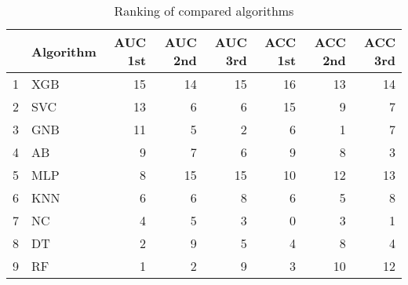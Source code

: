 \begin{table}
\footnotesize
\caption{Ranking of compared algorithms}
\label{tab:places}
\begin{tabular}{llrrrrrr}
\hline
 & Algorithm & AUC 1st & AUC 2nd & AUC 3rd & ACC 1st & ACC 2nd & ACC 3rd \\
\hline
1 & XGB & 15 & 14 & 15 & 16 & 13 & 14 \\
2 & SVC & 13 & 6 & 6 & 15 & 9 & 7 \\
3 & GNB & 11 & 5 & 2 & 6 & 1 & 7 \\
4 & AB & 9 & 7 & 6 & 9 & 8 & 3 \\
5 & MLP & 8 & 15 & 15 & 10 & 12 & 13 \\
6 & KNN & 6 & 6 & 8 & 6 & 5 & 8 \\
7 & NC & 4 & 5 & 3 & 0 & 3 & 1 \\
8 & DT & 2 & 9 & 5 & 4 & 8 & 4 \\
9 & RF & 1 & 2 & 9 & 3 & 10 & 12 \\
\hline
\end{tabular}
\end{table}
